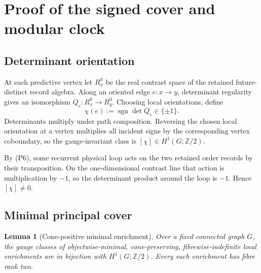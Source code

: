 \documentclass[11pt]{article}
\newtheorem{lemma}[theorem]{Lemma}
\theoremstyle{definition}
\theoremstyle{remark}
\newcommand{\sgn}{\operatorname{sgn}}
\newcommand{\Ztwo}{\mathbb Z/2}
\begin{document}
\section{Proof of the signed cover and modular clock}
\label{app:proof-signed-clock}

\subsection{Determinant orientation}

At each predictive vertex let $R_x^0$ be the real contrast space of the retained
future-distinct record algebra.  Along an oriented edge $e:x\to y$, determinant
regularity gives an isomorphism
$Q_e:R_x^0\to R_y^0$.  Choosing local orientations, define
\[
  \chi(e):=\sgn\det Q_e\in\{\pm1\}.
\]
Determinants multiply under path composition.  Reversing the chosen local
orientation at a vertex multiplies all incident signs by the corresponding
vertex coboundary, so the gauge-invariant class is
$[\chi]\in H^1(G;\Ztwo)$.

By \textup{(P6)}, some recurrent physical loop acts on
the two retained order records by their transposition.  On the one-dimensional
contrast line that action is multiplication by $-1$, so the determinant product
around the loop is $-1$.  Hence $[\chi]\ne0$.

\subsection{Minimal principal cover}

\begin{lemma}[Cone-positive minimal enrichment]
\label{lem:app-minimal-cover}
Over a fixed connected graph $G$, the gauge classes of objectwise-minimal,
cone-preserving, fibrewise-indefinite local enrichments are in bijection with
$H^1(G;\Ztwo)$.  Every such enrichment has fibre rank two.
\end{lemma}
\end{document}
